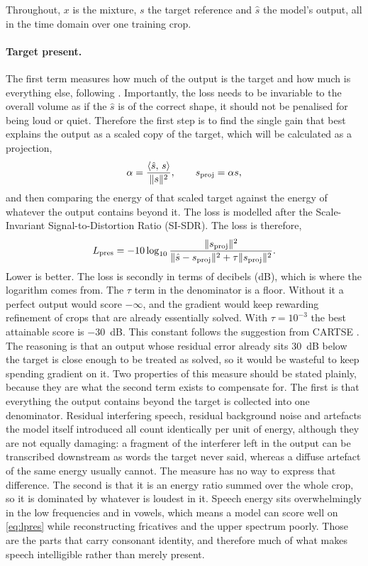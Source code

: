 Throughout, $x$ is the mixture, $s$ the target reference and $\hat{s}$ the model's output, all in the time domain over one training crop.

\paragraph{Target present.}
The first term measures how much of the output is the target and how much is everything else, following \cite{li2026cartse}. Importantly, the loss needs to be invariable to the overall volume as if the $\hat{s}$ is of the correct shape, it should not be penalised for being loud or quiet. Therefore the first step is to find the single gain that best explains the output as a scaled copy of the target, which will be calculated as a projection, 
\begin{equation}
\alpha = \frac{\langle \hat{s},\, s \rangle}{\lVert s \rVert^2},
\qquad
s_\textup{proj} = \alpha s,
\label{eq:alpha}
\end{equation}
and then comparing the energy of that scaled target against the energy of whatever the output contains beyond it. The loss is modelled after the Scale-Invariant Signal-to-Distortion Ratio (SI-SDR). The loss is therefore,
\begin{equation}
L_\textup{pres}
  = -10 \log_{10}
    \frac{\lVert s_\textup{proj} \rVert^2}
         {\lVert \hat{s} - s_\textup{proj} \rVert^2
          + \tau \lVert s_\textup{proj} \rVert^2}.
\label{eq:lpres}
\end{equation}
Lower is better. The loss is secondly in terms of decibels (dB), which is where the logarithm comes from. The $\tau$ term in the denominator is a floor. Without it a perfect output would score $-\infty$, and the gradient would keep rewarding refinement of crops that are already essentially solved. With $\tau = 10^{-3}$ the best attainable score is
\SI{-30}{dB}. This constant follows the suggestion from CARTSE \cite{li2026cartse}. The reasoning is that an output whose residual error already sits \SI{30}{dB} below the target is close enough to be treated as solved, so it would be wasteful to keep spending gradient on it. Two properties of this measure should be stated plainly, because they are what the second term exists to compensate for. The first is that everything the output contains beyond the target is collected into one denominator. Residual interfering speech, residual background noise and artefacts the model itself introduced all count identically per unit of energy, although they are not equally damaging: a fragment of the interferer left in the output can be transcribed downstream as words the target never said, whereas a diffuse artefact of the same energy usually cannot. The measure has no way to express that difference. The second is that it is an energy ratio summed over the whole crop, so it is dominated by whatever is loudest in it. Speech energy sits overwhelmingly in the low frequencies and in vowels, which means a model can score well on \eqref{eq:lpres} while reconstructing fricatives and the upper spectrum poorly. Those are the parts that carry consonant identity, and therefore much of what makes speech intelligible rather than merely present. 

